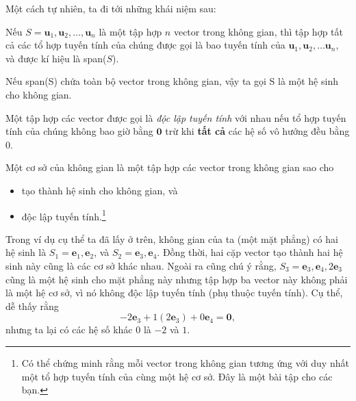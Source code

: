 Một cách tự nhiên, ta đi tới những khái niệm sau:
\begin{definition}
    Nếu \(S={\mathbf{u}_{1}, \mathbf{u}_{2},\dots,  \mathbf{u}_{n}}\) là một tập hợp \(n\) vector trong không gian, thì tập hợp tất cả các tổ hợp tuyến tính của chúng được gọi là bao tuyến tính của \(\mathbf{u}_{1}, \mathbf{u}_{2},\dots \mathbf{u}_{n}\), và được kí hiệu là span(\(S\)).
    \vspace{8pt}

    Nếu span(S) chứa toàn bộ vector trong không gian, vậy ta gọi S là một hệ sinh cho không gian.
\end{definition}

\begin{definition}
    Một tập hợp các vector được gọi là \emph{độc lập tuyến tính} với nhau nếu tổ hợp tuyến tính của chúng không bao giờ bằng \(\mathbf{0}\) trừ khi \textbf{tất cả} các hệ số vô hướng đều bằng \(0\).
\end{definition}
\begin{definition}[Hệ cơ sở]
    Một cơ sở của không gian là một tập hợp các vector trong không gian sao cho 
    \begin{itemize}
        \item tạo thành hệ sinh cho không gian, và
        \item độc lập tuyến tính.\footnote{Có thể chứng minh rằng mỗi vector trong không gian tương ứng với duy nhất một tổ hợp tuyến tính của cùng một hệ cơ sở. Đây là một bài tập cho các bạn.}
    \end{itemize}
\end{definition}
Trong ví dụ cụ thể ta đã lấy ở trên, không gian của ta (một mặt phẳng) có hai hệ sinh là \(S_1 ={\mathbf{e}_{1}, \mathbf{e}_2}\), và \(S_2 ={\mathbf{e}_{3}, \mathbf{e}_{4}}\). Đồng thời, hai cặp vector tạo thành hai hệ sinh này cũng là các cơ sở khác nhau. Ngoài ra cũng chú ý rằng, \(S_{3}={\mathbf{e}_{3}, \mathbf{e}_{4}, 2\mathbf{e}_{3}}\) cũng là một hệ sinh cho mặt phẳng này nhưng tập hợp ba vector này không phải là một hệ cơ sở, vì nó không độc lập tuyến tính (phụ thuộc tuyến tính). Cụ thể, dễ thấy rằng \[-2\mathbf{e}_{3}+1(2\mathbf{e}_{3})+0\mathbf{e}_{4}=\mathbf{0},\] nhưng ta lại có các hệ số khác \(0\) là \(-2\) và \(1\).

